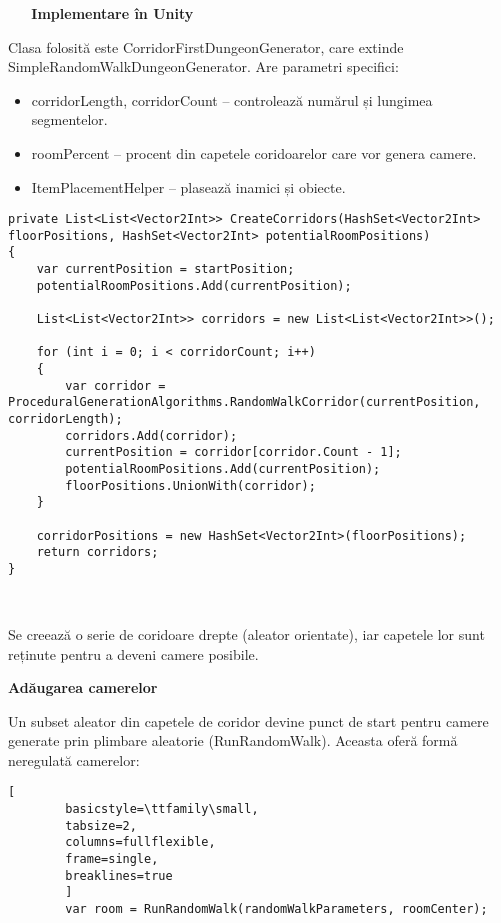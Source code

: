 \documentclass{article}
\begin{document}
	 \newline
	 
	\textbf{Implementare în Unity}
	
	Clasa folosită este {CorridorFirstDungeonGenerator}, care extinde SimpleRandomWalkDungeonGenerator. Are parametri specifici:
	\begin{itemize}
		\item corridorLength, corridorCount – controlează numărul și lungimea segmentelor.
		\item roomPercent – procent din capetele coridoarelor care vor genera camere.
		\item ItemPlacementHelper – plasează inamici și obiecte.
		
	\end{itemize}
	\lstset{style=sharpc}	
	\begin{lstlisting}[caption={Implementarea algoritmului Simple Random Walk din cadrul proiectului.}, 
		basicstyle=\ttfamily\small, 
		tabsize=4, 
		columns=fullflexible,
		frame=single,
		breaklines=true
		]
private List<List<Vector2Int>> CreateCorridors(HashSet<Vector2Int> floorPositions, HashSet<Vector2Int> potentialRoomPositions)
{
	var currentPosition = startPosition;
	potentialRoomPositions.Add(currentPosition);
	
	List<List<Vector2Int>> corridors = new List<List<Vector2Int>>();
	
	for (int i = 0; i < corridorCount; i++)
	{
		var corridor = ProceduralGenerationAlgorithms.RandomWalkCorridor(currentPosition, corridorLength);
		corridors.Add(corridor);
		currentPosition = corridor[corridor.Count - 1];
		potentialRoomPositions.Add(currentPosition);
		floorPositions.UnionWith(corridor);
	}
	
	corridorPositions = new HashSet<Vector2Int>(floorPositions);
	return corridors;
}

		
	\end{lstlisting}
	
	Se creează o serie de coridoare drepte (aleator orientate), iar capetele lor sunt reținute pentru a deveni camere posibile.

	\newpage
	\textbf{Adăugarea camerelor}
	
	Un subset aleator din capetele de coridor devine punct de start pentru camere generate prin plimbare aleatorie (RunRandomWalk). Aceasta oferă formă neregulată camerelor:
	\lstset{style=sharpc}	
	\begin{lstlisting}[
		basicstyle=\ttfamily\small, 
		tabsize=2, 
		columns=fullflexible,
		frame=single,
		breaklines=true
		]
		var room = RunRandomWalk(randomWalkParameters, roomCenter);
	\end{lstlisting}
	
\end{document}
